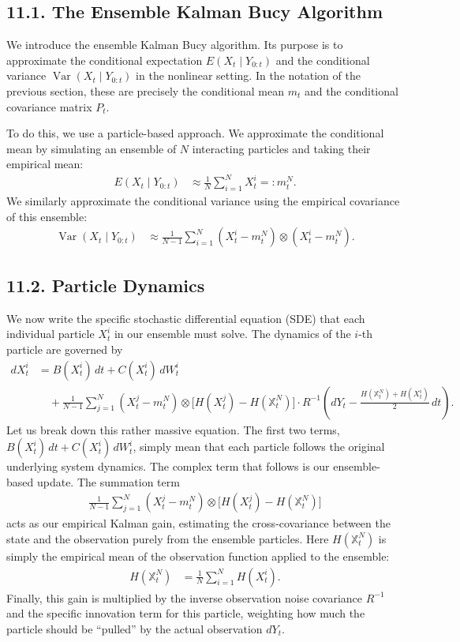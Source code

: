 \documentclass[11pt]{article}
\theoremstyle{definition}
\theoremstyle{remark}
\begin{document}
\subsection*{11.1. The Ensemble Kalman Bucy Algorithm}
We introduce the ensemble Kalman Bucy algorithm. Its purpose is to approximate the conditional expectation $E(X_t\mid Y_{0:t})$ and the conditional variance $\operatorname{Var}(X_t\mid Y_{0:t})$ in the nonlinear setting.
In the notation of the previous section, these are precisely the conditional mean $m_t$ and the conditional covariance matrix $P_t$.

To do this, we use a particle-based approach. We approximate the conditional mean by simulating an ensemble of $N$ interacting particles and taking their empirical mean:
\begin{align*}
E(X_t\mid Y_{0:t})
&\approx \frac{1}{N}\sum_{i=1}^N X_t^i
 =: m_t^N.
\end{align*}
We similarly approximate the conditional variance using the empirical covariance of this ensemble:
\begin{align*}
\operatorname{Var}(X_t\mid Y_{0:t})
&\approx \frac{1}{N-1}\sum_{i=1}^N (X_t^i-m_t^N)\otimes (X_t^i-m_t^N).
\end{align*}

\subsection*{11.2. Particle Dynamics}
We now write the specific stochastic differential equation (SDE) that each individual particle $X_t^i$ in our ensemble must solve. The dynamics of the $i$-th particle are governed by
\begin{align*}
dX_t^i
&=B(X_t^i)\,dt+C(X_t^i)\,dW_t^i \\
&\quad + \frac{1}{N-1}\sum_{j=1}^N (X_t^j-m_t^N)\otimes\bigl[H(X_t^j)-H(\mathbb X_t^N)\bigr] \cdot R^{-1}
\left(dY_t-\frac{H(\mathbb X_t^N)+H(X_t^i)}{2}\,dt\right).
\end{align*}
Let us break down this rather massive equation. The first two terms, $B(X_t^i)\,dt+C(X_t^i)\,dW_t^i$, simply mean that each particle follows the original underlying system dynamics. The complex term that follows is our ensemble-based update. The summation term
\begin{align*}
\frac{1}{N-1}\sum_{j=1}^N (X_t^j-m_t^N)\otimes\bigl[H(X_t^j)-H(\mathbb X_t^N)\bigr]
\end{align*}
acts as our empirical Kalman gain, estimating the cross-covariance between the state and the observation purely from the ensemble particles. Here $H(\mathbb X_t^N)$ is simply the empirical mean of the observation function applied to the ensemble:
\begin{align*}
H(\mathbb X_t^N)
&=
\frac{1}{N}\sum_{i=1}^N H(X_t^i).
\end{align*}
Finally, this gain is multiplied by the inverse observation noise covariance $R^{-1}$ and the specific innovation term for this particle, weighting how much the particle should be ``pulled'' by the actual observation $dY_t$.
\end{document}
